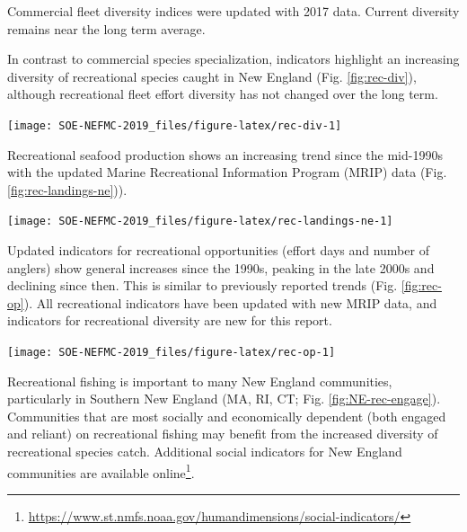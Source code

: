 \documentclass[10pt,]{article}
\let\rmarkdownfootnote\footnote%
\def\footnote{\protect\rmarkdownfootnote}
\let\origfigure\figure
\let\endorigfigure\endfigure
\renewenvironment{figure}[1][2] {
    \expandafter\origfigure\expandafter[H]
} {
    \endorigfigure
}
\begin{document}
Commercial fleet diversity indices were updated with 2017 data. Current
diversity remains near the long term average.

In contrast to commercial species specialization, indicators highlight
an increasing diversity of recreational species caught in New England
(Fig. \ref{fig:rec-div}), although recreational fleet effort diversity
has not changed over the long term.

\begin{figure}

{\centering \texttt{[image: SOE-NEFMC-2019\_files/figure-latex/rec-div-1]} 

}

\caption{Recreational effort diversity and diversity of recreational catch in the New England.}\label{fig:rec-div}
\end{figure}

Recreational seafood production shows an increasing trend since the
mid-1990s with the updated Marine Recreational Information Program
(MRIP) data (Fig. \ref{fig:rec-landings-ne})).

\begin{figure}

{\centering \texttt{[image: SOE-NEFMC-2019\_files/figure-latex/rec-landings-ne-1]} 

}

\caption{Total recreational seafood harvest in New England.}\label{fig:rec-landings-ne}
\end{figure}

Updated indicators for recreational opportunities (effort days and
number of anglers) show general increases since the 1990s, peaking in
the late 2000s and declining since then. This is similar to previously
reported trends (Fig. \ref{fig:rec-op}). All recreational indicators
have been updated with new MRIP data, and indicators for recreational
diversity are new for this report.

\begin{figure}

{\centering \texttt{[image: SOE-NEFMC-2019\_files/figure-latex/rec-op-1]} 

}

\caption{Recreational effort and number of recreational anglers in the New England.}\label{fig:rec-op}
\end{figure}

Recreational fishing is important to many New England communities,
particularly in Southern New England (MA, RI, CT; Fig.
\ref{fig:NE-rec-engage}). Communities that are most socially and
economically dependent (both engaged and reliant) on recreational
fishing may benefit from the increased diversity of recreational species
catch. Additional social indicators for New England communities are
available online\footnote{\url{https://www.st.nmfs.noaa.gov/humandimensions/social-indicators/}}.
\end{document}
